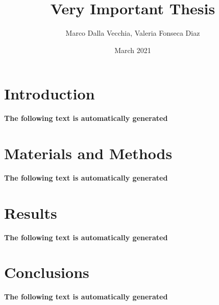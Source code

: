 \documentclass[12pt, letterpaper]{article}
\title{Very Important Thesis}
\author{Marco Dalla Vecchia, Valeria Fonseca Diaz}
\date{March 2021}
\begin{document}
\maketitle

\begin{abstract}
\lipsum[1-2]
\end{abstract}

\section{Introduction}
\textbf{The following text is automatically generated}
\newline
\lipsum[3-5]


\section{Materials and Methods}
\textbf{The following text is automatically generated}
\newline
\lipsum[6-7]

\section{Results}
\textbf{The following text is automatically generated}
\newline
\lipsum[8-10]

\section{Conclusions}
\textbf{The following text is automatically generated}
\newline
\lipsum[11-12]
\end{document}
